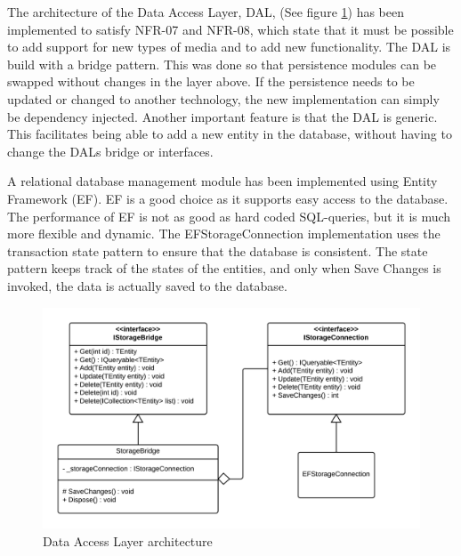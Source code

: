 \documentclass[../report.tex]{subfiles}
\begin{document}
\graphicspath{{img/}{../img/}}

The architecture of the Data Access Layer, DAL, (See figure \ref{fig:DALclassdiagram}) has been implemented to satisfy NFR-07 and NFR-08, which state that it must be possible to add support for new types of media and to add new functionality. The DAL is build with a bridge pattern. This was done so that persistence modules can be swapped without changes in the layer above. If the persistence needs to be updated or changed to another technology, the new implementation can simply be dependency injected. Another important feature is that the DAL is generic. This facilitates being able to add a new entity in the database, without having to change the DALs bridge or interfaces.

A relational database management module has been implemented using Entity Framework (EF). EF is a good choice as it supports easy access to the database. The performance of EF is not as good as hard coded SQL-queries, but it is much more flexible and dynamic. The EFStorageConnection implementation uses the transaction state pattern to ensure that the database is consistent. The state pattern keeps track of the states of the entities, and only when Save Changes is invoked, the data is actually saved to the database.

\begin{figure}[H]
\centering
\includegraphics[width=\linewidth]{DALclassdiagram.png}
\caption{Data Access Layer architecture}
\label{fig:DALclassdiagram}
\end{figure} 
\end{document}
